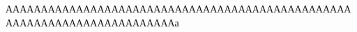 \begin{titlepage}
  АААААААААААААААААААААААААААААААААААААААААААААААААААААААААААААААААААААААААа
\end{titlepage}

